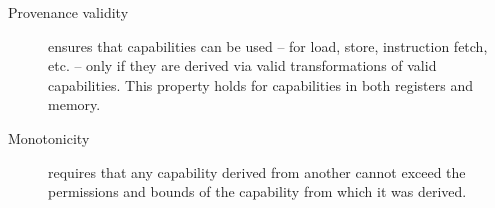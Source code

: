 \documentclass[12pt,twoside,openright,usletter]{article}
\newcommand{\note}[2]{{\color{blue}[ Note: #1 - #2]}}
\renewcommand{\note}[2]{\relax\ifhmode\unskip\fi}
\newcommand{\rwnote}[1]{\note{#1}{Robert W.}}
\newcommand{\psnote}[1]{\note{#1}{Peter S.}}
\newcommand{\pgnnote}[1]{\note{#1}{Peter N.}}
\begin{document}
\begin{description}
\item[Provenance validity] ensures that capabilities can be used -- for
  load, store, instruction fetch, etc. -- only if they are derived via valid
  transformations of valid capabilities.
  This property holds for capabilities in both registers and memory.




\item[Monotonicity] requires that any capability derived from another
  cannot exceed the permissions and bounds of the capability from which it was derived.
\psnote{That's not true as stated, unless one has a very particular notion of ``derive'' in mind.  In Kyndylan's setup, ``capability monotonicity can be formalised by stating
that for all actions except SealCapAction, UnsealCapAction,
InvokeCapability, and RaiseException the derived capability
is less than or equal to the capability it is derived from''.  Probably this document shouldn't go into that much detail, as one has to define ``actions'' and ``less than or equal to'', and this is mostly to do with sealed caps.  But it should include some caveat, e.g.,
``Monotonicity requires that any capability derived from another
cannot exceed the permissions and bounds of the capability from which it was derived (leaving sealed capabilities aside, for which the property is more involved).''}


\end{description}
\end{document}
